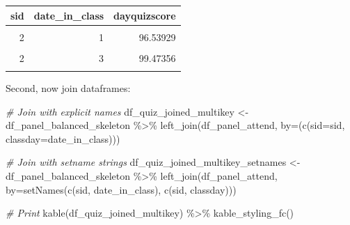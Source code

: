 \documentclass[
]{book}
\newenvironment{Shaded}{\begin{snugshade}}{\end{snugshade}}
\newcommand{\AttributeTok}[1]{\textcolor[rgb]{0.77,0.63,0.00}{#1}}
\newcommand{\CommentTok}[1]{\textcolor[rgb]{0.56,0.35,0.01}{\textit{#1}}}
\newcommand{\FunctionTok}[1]{\textcolor[rgb]{0.00,0.00,0.00}{#1}}
\newcommand{\NormalTok}[1]{#1}
\newcommand{\OtherTok}[1]{\textcolor[rgb]{0.56,0.35,0.01}{#1}}
\newcommand{\SpecialCharTok}[1]{\textcolor[rgb]{0.00,0.00,0.00}{#1}}
\newcommand{\StringTok}[1]{\textcolor[rgb]{0.31,0.60,0.02}{#1}}
\begin{document}
\begin{table}[!h]
\centering
\begin{tabular}{r|r|r}
\hline
sid & date\_in\_class & dayquizscore\\
\hline
\cellcolor{gray!6}{1} & \cellcolor{gray!6}{1} & \cellcolor{gray!6}{89.88726}\\
\hline
2 & 1 & 96.53929\\
\hline
\cellcolor{gray!6}{2} & \cellcolor{gray!6}{2} & \cellcolor{gray!6}{65.59195}\\
\hline
2 & 3 & 99.47356\\
\hline
\cellcolor{gray!6}{4} & \cellcolor{gray!6}{2} & \cellcolor{gray!6}{97.36936}\\
\hline
\end{tabular}
\end{table}

Second, now join dataframes:

\begin{Shaded}
\begin{Highlighting}[]
\CommentTok{\# Join with explicit names}
\NormalTok{df\_quiz\_joined\_multikey }\OtherTok{\textless{}{-}}\NormalTok{ df\_panel\_balanced\_skeleton }\SpecialCharTok{\%\textgreater{}\%}
  \FunctionTok{left\_join}\NormalTok{(df\_panel\_attend,}
            \AttributeTok{by=}\NormalTok{(}\FunctionTok{c}\NormalTok{(}\StringTok{\textquotesingle{}sid\textquotesingle{}}\OtherTok{=}\StringTok{\textquotesingle{}sid\textquotesingle{}}\NormalTok{, }\StringTok{\textquotesingle{}classday\textquotesingle{}}\OtherTok{=}\StringTok{\textquotesingle{}date\_in\_class\textquotesingle{}}\NormalTok{)))}

\CommentTok{\# Join with setname strings}
\NormalTok{df\_quiz\_joined\_multikey\_setnames }\OtherTok{\textless{}{-}}\NormalTok{ df\_panel\_balanced\_skeleton }\SpecialCharTok{\%\textgreater{}\%}
  \FunctionTok{left\_join}\NormalTok{(df\_panel\_attend, }\AttributeTok{by=}\FunctionTok{setNames}\NormalTok{(}\FunctionTok{c}\NormalTok{(}\StringTok{\textquotesingle{}sid\textquotesingle{}}\NormalTok{, }\StringTok{\textquotesingle{}date\_in\_class\textquotesingle{}}\NormalTok{), }\FunctionTok{c}\NormalTok{(}\StringTok{\textquotesingle{}sid\textquotesingle{}}\NormalTok{, }\StringTok{\textquotesingle{}classday\textquotesingle{}}\NormalTok{)))}

\CommentTok{\# Print}
\FunctionTok{kable}\NormalTok{(df\_quiz\_joined\_multikey) }\SpecialCharTok{\%\textgreater{}\%}
  \FunctionTok{kable\_styling\_fc}\NormalTok{()}
\end{Highlighting}
\end{Shaded}
\end{document}
